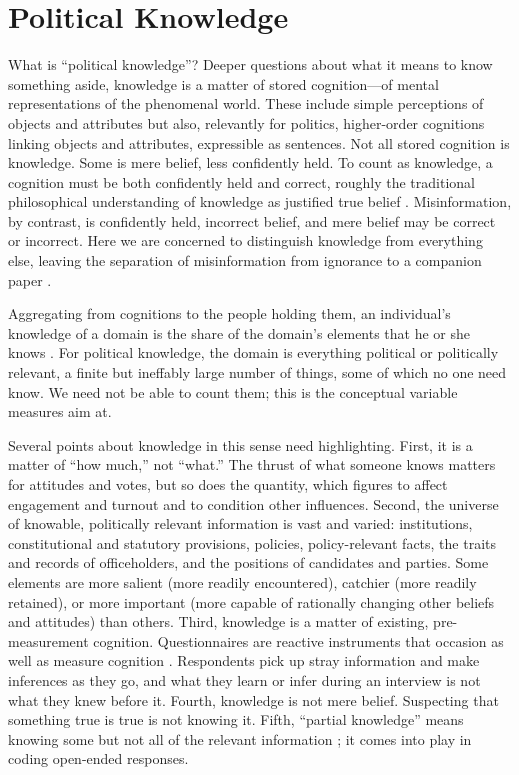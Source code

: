 \documentclass[11pt]{article}
\begin{document}
\section{Political Knowledge}

What is ``political knowledge''? Deeper questions about what it means to know something aside, knowledge is a matter of stored cognition---of mental representations of the phenomenal world. These include simple perceptions of objects and attributes but also, relevantly for politics, higher-order cognitions linking objects and attributes, expressible as sentences. Not all stored cognition is knowledge. Some is mere belief, less confidently held. To count as knowledge, a cognition must be both confidently held and correct, roughly the traditional philosophical understanding of knowledge as justified true belief \citep{sosa1991}. Misinformation, by contrast, is confidently held, incorrect belief, and mere belief may be correct or incorrect. Here we are concerned to distinguish knowledge from everything else, leaving the separation of misinformation from ignorance to a companion paper \citep{luskin2018}.

Aggregating from cognitions to the people holding them, an individual's knowledge of a domain is the share of the domain's elements that he or she knows \citep{luskin2026}. For political knowledge, the domain is everything political or politically relevant, a finite but ineffably large number of things, some of which no one need know. We need not be able to count them; this is the conceptual variable measures aim at.

Several points about knowledge in this sense need highlighting. First, it is a matter of ``how much,'' not ``what.'' The thrust of what someone knows matters for attitudes and votes, but so does the quantity, which figures to affect engagement and turnout and to condition other influences. Second, the universe of knowable, politically relevant information is vast and varied: institutions, constitutional and statutory provisions, policies, policy-relevant facts, the traits and records of officeholders, and the positions of candidates and parties. Some elements are more salient (more readily encountered), catchier (more readily retained), or more important (more capable of rationally changing other beliefs and attitudes) than others. Third, knowledge is a matter of existing, pre-measurement cognition. Questionnaires are reactive instruments that occasion as well as measure cognition \citep{webb1966}. Respondents pick up stray information and make inferences as they go, and what they learn or infer during an interview is not what they knew before it. Fourth, knowledge is not mere belief. Suspecting that something true is true is not knowing it. Fifth, ``partial knowledge'' means knowing some but not all of the relevant information \citep{luskin2011}; it comes into play in coding open-ended responses.
\end{document}

